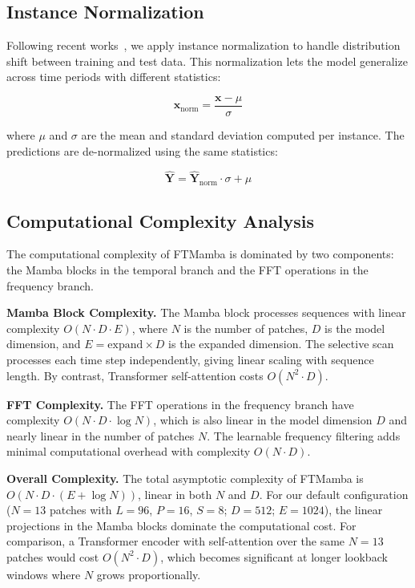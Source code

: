 \documentclass[electronics,article,submit,pdftex,moreauthors]{Definitions/mdpi}
\begin{document}
\subsection{Instance Normalization}

Following recent works~\cite{ref8,ref9}, we apply instance normalization to handle distribution shift between training and test data. This normalization lets the model generalize across time periods with different statistics:
\begin{linenomath}
\begin{equation}
\mathbf{x}_{\text{norm}} = \frac{\mathbf{x} - \mu}{\sigma}
\end{equation}
\end{linenomath}
where $\mu$ and $\sigma$ are the mean and standard deviation computed per instance. The predictions are de-normalized using the same statistics:
\begin{linenomath}
\begin{equation}
\hat{\mathbf{Y}} = \hat{\mathbf{Y}}_{\text{norm}} \cdot \sigma + \mu
\end{equation}
\end{linenomath}

\subsection{Computational Complexity Analysis}

The computational complexity of FTMamba is dominated by two components: the Mamba blocks in the temporal branch and the FFT operations in the frequency branch.

\textbf{Mamba Block Complexity.} The Mamba block processes sequences with linear complexity $O(N \cdot D \cdot E)$, where $N$ is the number of patches, $D$ is the model dimension, and $E = \text{expand} \times D$ is the expanded dimension. The selective scan processes each time step independently, giving linear scaling with sequence length. By contrast, Transformer self-attention costs $O(N^2 \cdot D)$.

\textbf{FFT Complexity.} The FFT operations in the frequency branch have complexity $O(N \cdot D \cdot \log N)$, which is also linear in the model dimension $D$ and nearly linear in the number of patches $N$. The learnable frequency filtering adds minimal computational overhead with complexity $O(N \cdot D)$.

\textbf{Overall Complexity.} The total asymptotic complexity of FTMamba is $O(N \cdot D \cdot (E + \log N))$, linear in both $N$ and $D$. For our default configuration ($N = 13$ patches with $L = 96$, $P = 16$, $S = 8$; $D = 512$; $E = 1024$), the linear projections in the Mamba blocks dominate the computational cost. For comparison, a Transformer encoder with self-attention over the same $N=13$ patches would cost $O(N^2 \cdot D)$, which becomes significant at longer lookback windows where $N$ grows proportionally.
\end{document}
